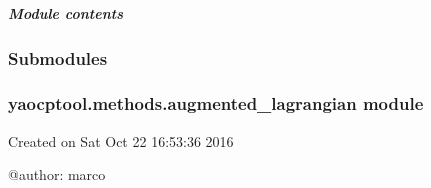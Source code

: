 \documentclass[letterpaper,10pt,english]{sphinxmanual}
\begin{document}
\subparagraph{Module contents}
\label{\detokenize{yaocptool.methods.classic:module-yaocptool.methods.classic}}\label{\detokenize{yaocptool.methods.classic:module-contents}}

\subsubsection{Submodules}
\label{\detokenize{yaocptool.methods:submodules}}

\subsubsection{yaocptool.methods.augmented\_lagrangian module}
\label{\detokenize{yaocptool.methods:module-yaocptool.methods.augmented_lagrangian}}\label{\detokenize{yaocptool.methods:yaocptool-methods-augmented-lagrangian-module}}
Created on Sat Oct 22 16:53:36 2016

@author: marco
\end{document}
